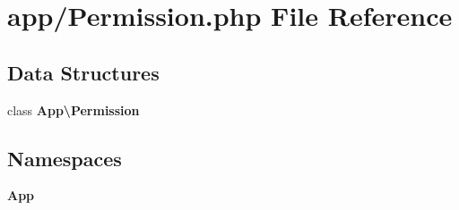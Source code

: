 \section{app/\+Permission.php File Reference}
\label{_permission_8php}
\subsection*{Data Structures}
\begin{DoxyCompactItemize}
\item 
class {\bf App\textbackslash{}\+Permission}
\end{DoxyCompactItemize}
\subsection*{Namespaces}
\begin{DoxyCompactItemize}
\item 
 {\bf App}
\end{DoxyCompactItemize}
